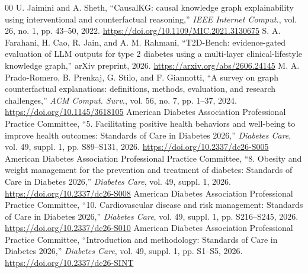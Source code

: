 \documentclass[conference]{IEEEtran}
\begin{document}
\begin{thebibliography}{00}
 U. Jaimini and A. Sheth, ``CausalKG: causal knowledge graph explainability using interventional and counterfactual reasoning,'' \emph{IEEE Internet Comput.}, vol. 26, no. 1, pp. 43--50, 2022. \url{https://doi.org/10.1109/MIC.2021.3130675}
 S. A. Farahani, H. Cao, R. Jain, and A. M. Rahmani, ``T2D-Bench: evidence-gated evaluation of LLM outputs for type 2 diabetes using a multi-layer clinical-lifestyle knowledge graph,'' arXiv preprint, 2026. \url{https://arxiv.org/abs/2606.24145}
 M. A. Prado-Romero, B. Prenkaj, G. Stilo, and F. Giannotti, ``A survey on graph counterfactual explanations: definitions, methods, evaluation, and research challenges,'' \emph{ACM Comput. Surv.}, vol. 56, no. 7, pp. 1--37, 2024. \url{https://doi.org/10.1145/3618105}
 American Diabetes Association Professional Practice Committee, ``5. Facilitating positive health behaviors and well-being to improve health outcomes: Standards of Care in Diabetes 2026,'' \emph{Diabetes Care}, vol. 49, suppl. 1, pp. S89--S131, 2026. \url{https://doi.org/10.2337/dc26-S005}
 American Diabetes Association Professional Practice Committee, ``8. Obesity and weight management for the prevention and treatment of diabetes: Standards of Care in Diabetes 2026,'' \emph{Diabetes Care}, vol. 49, suppl. 1, 2026. \url{https://doi.org/10.2337/dc26-S008}
 American Diabetes Association Professional Practice Committee, ``10. Cardiovascular disease and risk management: Standards of Care in Diabetes 2026,'' \emph{Diabetes Care}, vol. 49, suppl. 1, pp. S216--S245, 2026. \url{https://doi.org/10.2337/dc26-S010}
 American Diabetes Association Professional Practice Committee, ``Introduction and methodology: Standards of Care in Diabetes 2026,'' \emph{Diabetes Care}, vol. 49, suppl. 1, pp. S1--S5, 2026. \url{https://doi.org/10.2337/dc26-SINT}
\end{thebibliography}
\end{document}
